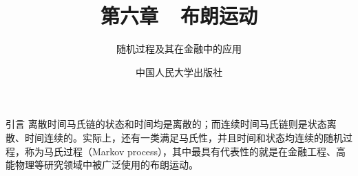 \documentclass[t]{beamer}
\begin{document}
\fontsize{11}{18}\selectfont


\CTEXindent



  \title{第六章~~布朗运动}
\author{随机过程及其在金融中的应用}
\date{中国人民大学出版社}
  \begin{frame}
    \maketitle
  \end{frame}

  \begin{frame}{引言}
    离散时间马氏链的状态和时间均是离散的；而连续时间马氏链则是状态离散、时间连续的。实际上，还有一类满足马氏性，并且时间和状态均连续的随机过程，称为马氏过程（Markov process），其中最具有代表性的就是在金融工程、高能物理等研究领域中被广泛使用的布朗运动。


\end{frame}
\end{document}

